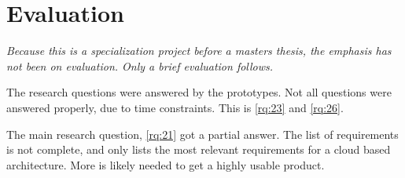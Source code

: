 \chapter{Evaluation}


\emph{Because this is a specialization project before a masters thesis, the emphasis has not been on evaluation. Only a brief evaluation follows.}


\par
The research questions were answered by the prototypes.
Not all questions were answered properly, due to time constraints.
This is \cref{rq:23} and \cref{rq:26}.

\par
The main research question, \cref{rq:21} got a partial answer.
The list of requirements is not complete, and only lists the most relevant requirements for a \gls{cloud} based architecture.
More is likely needed to get a highly usable product.